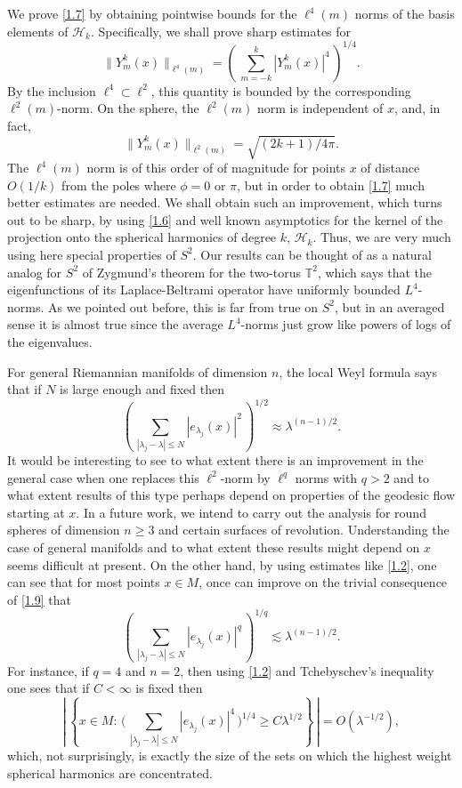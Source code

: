 \documentclass[10pt]{amsart}
\begin{document}
We prove \eqref{1.7} by obtaining pointwise bounds for the $\ell^4(m)$ norms
of the basis elements of ${\mathcal H}_k$.  Specifically, we shall prove sharp
estimates for
$$\|Y^k_m(x)\|_{\ell^4(m)}=\left(\, \sum_{m=-k}^k|Y^k_m(x)|^4\, \right)^{1/4}.$$
By the inclusion $\ell^4\subset \ell^2$, this quantity is bounded by the
corresponding $\ell^2(m)$-norm.  On the sphere, the $\ell^2(m)$ norm is independent
of $x$, and, in fact,
\begin{equation}\label{8}
\|Y^k_m(x)\|_{\ell^2(m)}=\sqrt{(2k+1)/4\pi}.
\end{equation}
The $\ell^4(m)$ norm is of this order of of magnitude for points $x$ of distance
$O(1/k)$ from the poles where $\phi=0$ or $\pi$, but in order to obtain
\eqref{1.7} much better estimates are needed.  We shall obtain such an improvement,
which turns out to be sharp, by using \eqref{1.6} and well known asymptotics
for the kernel of the projection onto the spherical harmonics of degree
$k$, ${\mathcal H}_k$.  Thus, we are very much using here special properties
of $S^2$.   Our results can be thought of as a natural analog for $S^2$
of Zygmund's \cite{zygmund} theorem for the two-torus ${\mathbb T}^2$,
which says that the eigenfunctions of its Laplace-Beltrami operator have uniformly
bounded $L^4$-norms.  As we pointed out before, this is far from true on
$S^2$, but in an averaged sense it is almost true since the average $L^4$-norms
just grow like powers of logs of the eigenvalues.

For general Riemannian manifolds of dimension $n$, the local Weyl formula says
that if $N$ is large enough and fixed then
\begin{equation}\label{1.9}
\left(\, \sum_{|\lambda_j-\lambda|\le N}|e_{\lambda_j}(x)|^2\, \right)^{1/2}
\approx \lambda^{(n-1)/2}.
\end{equation}
It would be interesting to see to what extent there is an
improvement in the general case when one replaces this
$\ell^2$-norm by $\ell^q$ norms with $q>2$ and to what extent
results of this type perhaps depend on properties of the geodesic
flow  starting at $x$.  In a future work, we intend to carry out
the analysis for round spheres of dimension $n\ge3$ and certain
surfaces of revolution.  Understanding the case of general
manifolds and to what extent these results might depend on $x$
seems difficult at present.  On the other hand, by using estimates
like \eqref{1.2}, one can see that for most points $x\in M$, once
can improve on the trivial consequence of \eqref{1.9} that
$$\left(\, \sum_{|\lambda_j-\lambda|\le N}|e_{\lambda_j}(x)|^q\, \right)^{1/q}\lesssim
\lambda^{(n-1)/2}.$$
For instance, if $q=4$ and $n=2$, then using \eqref{1.2} and Tchebyschev's inequality
one sees that if $C<\infty$ is fixed then
$$\left|\, \left\{x\in M: \, \bigl(\, \sum_{|\lambda_j-\lambda|\le N}|e_{\lambda_j}(x)|^4\,
\bigr)^{1/4}\ge C\lambda^{1/2}\right\}\, \right|=O(\lambda^{-1/2}),$$
which, not surprisingly, is exactly the size of the sets on which the highest weight spherical
harmonics are concentrated.
\end{document}
